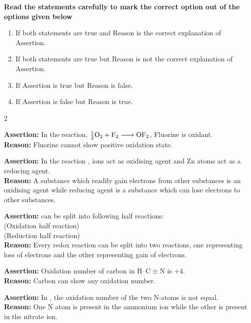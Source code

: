 \documentclass[10pt,a4paper]{article}
\begin{document}
\noindent\textbf{Read the statements carefully to mark the correct option out of the options given below}

\begin{enumerate}[label=(\arabic*), leftmargin=2em, itemsep=1pt]
  \item If both statements are true and Reason is the correct explanation of Assertion.
  \item If both statements are true but Reason is not the correct explanation of Assertion.
  \item If Assertion is true but Reason is false.
  \item If Assertion is false but Reason is true.
\end{enumerate}

\begin{multicols}{2}
\begin{questions}[start=1]

\item \textbf{Assertion:} In the reaction, $\frac{1}{2}\ce{O2 + F2 -> OF2}$, Fluorine is oxidant.\\
\textbf{Reason:} Fluorine cannot show positive oxidation state.

\item \textbf{Assertion:} In the reaction ,  ions act as oxidising agent and Zn atoms act as a reducing agent.\\
\textbf{Reason:} A substance which readily gain electrons from other substances is an oxidising agent while reducing agent is a substance which can lose electrons to other substances.

\item \textbf{Assertion:}  can be split into following half reactions:\\
 (Oxidation half reaction)\\
 (Reduction half reaction)\\
\textbf{Reason:} Every redox reaction can be split into two reactions, one representing loss of electrons and the other representing gain of electrons.

\item \textbf{Assertion:} Oxidation number of carbon in H--C$\equiv$N is $+4$.\\
\textbf{Reason:} Carbon can show any oxidation number.

\item \textbf{Assertion:} In , the oxidation number of the two N-atoms is not equal.\\
\textbf{Reason:} One N atom is present in the ammonium ion while the other is present in the nitrate ion.


\end{questions}
\end{multicols}
\end{document}
